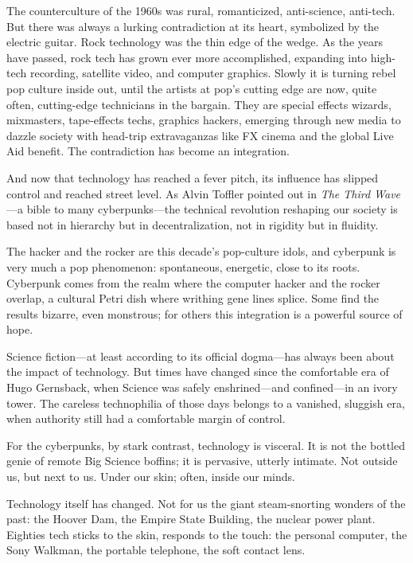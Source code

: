 The counterculture of the 1960s was rural, romanticized, anti-science, anti-tech. But there was always a lurking contradiction at its heart, symbolized by the electric guitar. Rock technology was the thin edge of the wedge. As the years have passed, rock tech has grown ever more accomplished, expanding into high-tech recording, satellite video, and computer graphics. Slowly it is turning rebel pop culture inside out, until the artists at pop's cutting edge are now, quite often, cutting-edge technicians in the bargain. They are special effects wizards, mixmasters, tape-effects techs, graphics hackers, emerging through new media to dazzle society with head-trip extravaganzas like FX cinema and the global Live Aid benefit. The contradiction has become an integration.

And now that technology has reached a fever pitch, its influence has slipped control and reached street level. As Alvin Toffler pointed out in \textit{The Third Wave}---a bible to many cyberpunks---the technical revolution reshaping our society is based not in hierarchy but in decentralization, not in rigidity but in fluidity.

The hacker and the rocker are this decade's pop-culture idols, and cyberpunk is very much a pop phenomenon: spontaneous, energetic, close to its roots. Cyberpunk comes from the realm where the computer hacker and the rocker overlap, a cultural Petri dish where writhing gene lines splice. Some find the results bizarre, even monstrous; for others this integration is a powerful source of hope.

Science fiction---at least according to its official dogma---has always been about the impact of technology. But times have changed since the comfortable era of Hugo Gernsback, when Science was safely enshrined---and confined---in an ivory tower. The careless technophilia of those days belongs to a vanished, sluggish era, when authority still had a comfortable margin of control.

For the cyberpunks, by stark contrast, technology is visceral. It is not the bottled genie of remote Big Science boffins; it is pervasive, utterly intimate. Not outside us, but next to us. Under our skin; often, inside our minds.

Technology itself has changed. Not for us the giant steam-snorting wonders of the past: the Hoover Dam, the Empire State Building, the nuclear power plant. Eighties tech sticks to the skin, responds to the touch: the personal computer, the Sony Walkman, the portable telephone, the soft contact lens.

